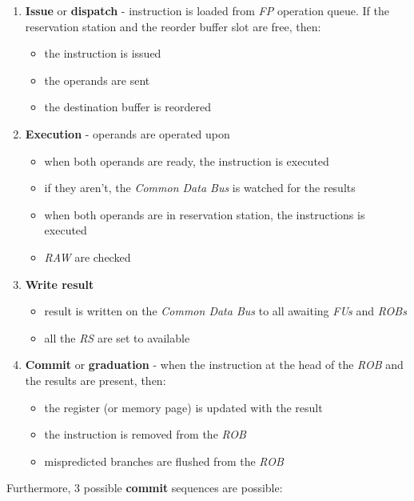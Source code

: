 \documentclass[english]{article}
\begin{document}
\begin{enumerate}
  \item \textbf{Issue} or \textbf{dispatch} - instruction is loaded from \textit{FP} operation queue. If the reservation station and the reorder buffer slot are free, then:
        \begin{itemize}
          \item the instruction is issued
          \item the operands are sent
          \item the destination buffer is reordered
        \end{itemize}
  \item \textbf{Execution} - operands are operated upon
        \begin{itemize}
          \item when both operands are ready, the instruction is executed
          \item if they aren't, the \textit{Common Data Bus} is watched for the results
          \item when both operands are in reservation station, the instructions is executed
          \item \textit{RAW} are checked
        \end{itemize}
  \item \textbf{Write result}
        \begin{itemize}
          \item result is written on the \textit{Common Data Bus} to all awaiting \textit{FUs} and \textit{ROBs}
          \item all the \textit{RS} are set to available
        \end{itemize}
  \item \textbf{Commit} or \textbf{graduation} - when the instruction at the head of the \textit{ROB} and the results are present, then:
        \begin{itemize}
          \item the register (or memory page) is updated with the result
          \item the instruction is removed from the \textit{ROB}
          \item mispredicted branches are flushed from the \textit{ROB}
        \end{itemize}
\end{enumerate}

Furthermore, 3 possible \textbf{commit} sequences are possible:
\end{document}

